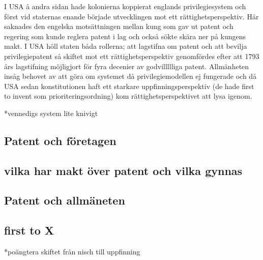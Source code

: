 I USA å andra sidan hade kolonierna koppierat englands privilegiesystem och först vid staternas enande började utvecklingen mot ett rättighetsperspektiv. Här saknades den engelska motsättningen mellan kung som gav ut patent och regering som kunde reglera patent i lag och också sökte skära ner på kungens makt. I USA höll staten båda rollerna; att lagstifna om patent och att bevilja privilegiepatent så skiftet mot ett rättighetsperspektiv genomfördes efter att 1793 års lagstifning möjligjort för fyra decenier av godvillllliga patent. Allmänheten insåg behovet av att göra om systemet då privilegiemodellen ej fungerade och då USA sedan konstitutionen haft ett starkare uppfinningsperspektiv (de hade first to invent som prioriteringsordning) kom rättighetsperspektivet att lysa igenom.


*vennedigs system lite knivigt

\subsection{Patent och företagen}

\subsection{vilka har makt över patent och vilka gynnas}


\subsection{Patent och allmäneten}


\subsection{first to X}


*poängtera skiftet från nisch till uppfinning